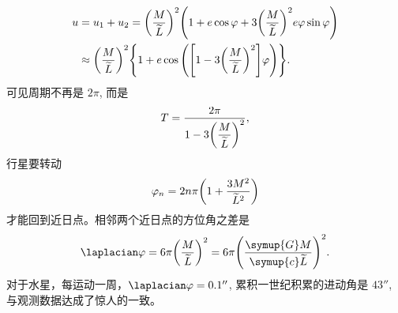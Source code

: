 \documentclass[UTF8, 12pt, a4paper, oneside, onecolumn, fontset=none]{ctexart}
\begin{document}
\begin{align}
u&=u_{1}+u_{2}=\mleft(\frac{M}{\widetilde{L}}\mright)^{2}\mleft(1+e\cos{\varphi}+3\mleft(\frac{M}{\widetilde{L}}\mright)^{2}e\varphi\sin{\varphi}\mright)\notag\\
&\approx\mleft(\frac{M}{\widetilde{L}}\mright)^{2}\mleft\{1+e\cos{\mleft(\mleft[1-3\mleft(\frac{M}{\widetilde{L}}\mright)^{2}\mright]\varphi\mright)}\mright\}.
\end{align}
可见周期不再是 $2\pi$, 而是
\begin{equation}
T=\frac{2\pi}{1-3\mleft(\dfrac{M}{\widetilde{L}}\mright)^{2}},
\end{equation}
行星要转动
\begin{equation}
\varphi_{n}=2n\pi\mleft(1+\frac{3M^{2}}{\widetilde{L}^{2}}\mright)
\end{equation}
才能回到近日点。相邻两个近日点的方位角之差是
\begin{equation}
\laplacian\varphi=6\pi\mleft(\frac{M}{\widetilde{L}}\mright)^{2}=6\pi\mleft(\frac{\symup{G}M}{\symup{c}\widetilde{L}}\mright)^{2}.
\end{equation}
对于水星，每运动一周，$\laplacian\varphi=\ang{;; 0.1}$, 累积一世纪积累的进动角是 $\ang{;; 43}$, 与观测数据达成了惊人的一致。
\end{document}
